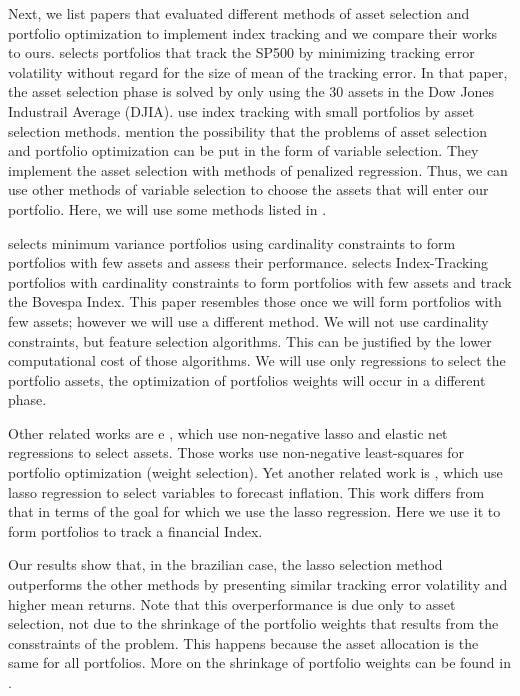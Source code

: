 \documentclass[preprint,authoryear,review,12pt]{elsarticle}
\begin{document}
Next, we list papers that evaluated different methods of asset selection and portfolio optimization to implement index tracking and we compare their works to ours.
%
\cite{liu-2009} selects portfolios that track the SP500 by minimizing tracking error volatility without regard for the size of mean of the tracking error.
In that paper, the asset selection phase is solved by only using the 30 assets in the Dow Jones Industrail Average (DJIA).
\cite{dijk2002} use index tracking with small portfolios by asset selection methods.
\cite{PLS10} mention the possibility that the problems of asset selection and portfolio optimization can be put in the form of variable selection.
They implement the asset selection with methods of penalized regression.
Thus, we can use other methods of variable selection to choose the assets that will enter our portfolio.
Here, we will use some methods listed in \cite{isl-2014}.

\cite{santos15} selects minimum variance portfolios using cardinality constraints to form portfolios with few assets and assess their performance.
\cite{rbfin-it} selects Index-Tracking portfolios with cardinality constraints to form portfolios with few assets and track the Bovespa Index.
This paper resembles those once we will form portfolios with few assets; however we will use a different method.
We will not use cardinality constraints, but feature selection algorithms.
This can be justified by the lower computational cost of those algorithms.
We will use only regressions to select the portfolio assets, the optimization of portfolios weights will occur in a different phase.

Other related works are \cite{nnl14} e \cite{nnen14}, which use non-negative lasso and elastic net regressions to select assets.
Those works use non-negative least-squares for portfolio optimization (weight selection).
Yet another related work is \cite{lasso-infl}, which use lasso regression to select variables to forecast inflation.
This work differs from that in terms of the goal for which we use the lasso regression.
Here we use it to form portfolios to track a financial Index.


Our results show that, in the brazilian case, the lasso selection method outperforms the other methods by presenting similar tracking error volatility and higher mean returns.
Note that this overperformance is due only to asset selection, not due to the shrinkage of the portfolio weights that results from the consstraints of the problem.
This happens because the asset allocation is the same for all portfolios.
More on the shrinkage of portfolio weights can be found in \cite{fan-2012, jag-2003, brodie2009}.
\end{document}
